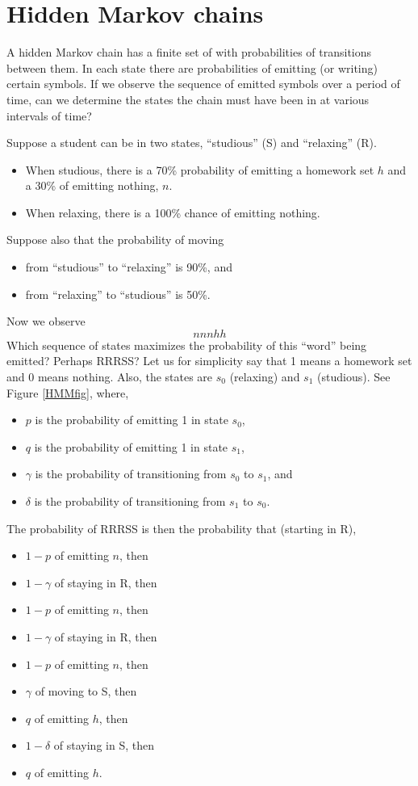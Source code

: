 \section{Hidden Markov chains}
	A hidden Markov chain has a finite set of  with probabilities of transitions between them.
	In each state there are probabilities of emitting (or writing) certain symbols.
	If we observe the sequence of emitted symbols over a period of time, can we determine the states the chain must have been in at various intervals of time?

	Suppose a student can be in two states, ``studious'' (S) and ``relaxing'' (R).
	\begin{itemize}
	\item When studious, there is a 70\% probability of emitting a homework set $h$ and a 30\% of emitting nothing, $n$.
	\item When relaxing, there is a 100\% chance of emitting nothing.
	\end{itemize}
	Suppose also that the probability of moving 
	\begin{itemize}
	\item from ``studious'' to ``relaxing'' is 90\%, and
	\item from ``relaxing'' to ``studious'' is 50\%.
	\end{itemize}
	Now we observe
	\[
		nnnhh
	\]
	Which sequence of states maximizes the probability of this ``word'' being emitted?
	Perhaps RRRSS?
	Let us for simplicity say that 1 means a homework set and 0 means nothing.
	Also, the states are $s_0$ (relaxing) and $s_1$ (studious).
	See Figure \ref{HMMfig}, where,
	\begin{itemize}
		\item $p$ is the probability of emitting 1 in state $s_0$,
		\item $q$ is the probability of emitting 1 in state $s_1$,
		\item $\gamma$ is the probability of transitioning from $s_0$ to $s_1$, and
		\item $\delta$ is the probability of transitioning from $s_1$ to $s_0$.
	\end{itemize}
	The probability of RRRSS is then the probability that (starting in R),
	\begin{itemize}
		\item $1-p$ of emitting $n$, then
		\item $1-\gamma$ of staying in R, then
		\item $1-p$ of emitting $n$, then
		\item $1-\gamma$ of staying in R, then
		\item $1-p$ of emitting $n$, then
		\item $\gamma$ of moving to S, then
		\item $q$ of emitting $h$, then
		\item $1-\delta$ of staying in S, then
		\item $q$ of emitting $h$.
	\end{itemize}
